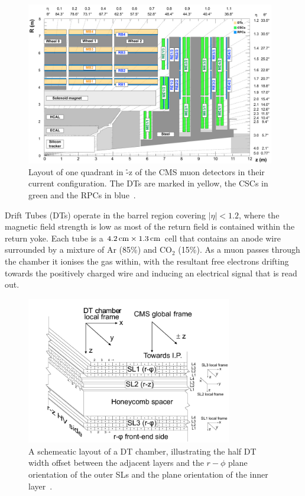\begin{figure}[htbp]
\begin{center}
\includegraphics[width=0.97\textwidth]{figs/cms/cms_muon_quadrant_run_ii.pdf}
\caption{Layout of one quadrant in \r-z of the CMS muon detectors in their current configuration.
The DTs are marked in yellow, the CSCs in green and the RPCs in blue~\cite{CMS-DP-2016-046}.}
\label{fig:muonChambers}
\end{center}
\end{figure}

Drift Tubes (DTs) operate in the barrel region covering $|\eta| < 1.2$, where the magnetic field strength is low as most of the return field is contained within the return yoke.
Each tube is a $4.2\,\text{cm} \times 1.3\,\text{cm}$ cell that contains an anode wire surrounded by a mixture of Ar (85\%) and CO$_{2}$ (15\%).
As a muon passes through the chamber it ionises the gas within, with the resultant free electrons drifting towards the positively charged wire and inducing an electrical signal that is read out.

\begin{figure}[htb]
\begin{center}
\includegraphics[width=0.8\textwidth]{figs/cms/DTchamber.png}
\caption{A schemeatic layout of a DT chamber, illustrating the half DT width offset between the adjacent layers and the $r-\phi$ plane orientation of the outer SLs and the \rz plane orientation of the inner layer~\cite{Chatrchyan:2009hg}.}
\label{fig:dtSuperLayers}
\end{center}
\end{figure}

